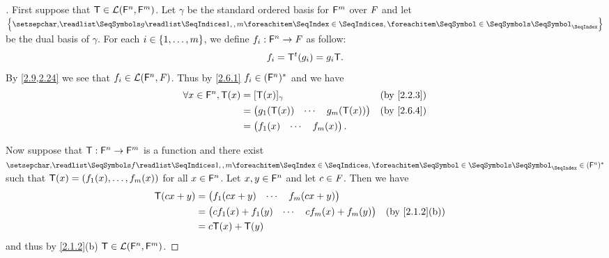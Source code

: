 \begin{proof}[]
  First suppose that \(\mathsf{T} \in \mathcal{L}(\mathsf{F}^n, \mathsf{F}^m)\).
  Let \(\gamma\) be the standard ordered basis for \(\mathsf{F}^m\) over \(\mathit{F}\) and let \(\set{\seq{g}{1,,m}}\) be the dual basis of \(\gamma\).
  For each \(i \in \left\lbrace1, \dots, m\right\rbrace\), we define \(f_i : \mathsf{F}^n \to \mathit{F}\) as follow:
  \[
    f_i = {\mathsf{T}}^{t}(g_i) = g_i \mathsf{T}.
  \]
  By \cref{2.9,2.24} we see that \(f_i \in \mathcal{L}(\mathsf{F}^n, \mathit{F})\).
  Thus by \cref{2.6.1} \(f_i \in (\mathsf{F}^n)^*\) and we have
  \begin{align*}
    \forall x \in \vs{F}^n, \T(x) & = [\T(x)]_{\gamma}                &  & \text{(by \cref{2.2.3})} \\
                                  & = \begin{pmatrix}
                                        g_1(\T(x)) & \cdots & g_m(\T(x))
                                      \end{pmatrix} &  & \text{(by \cref{2.6.4})}                   \\
                                  & = \begin{pmatrix}
                                        f_1(x) & \cdots & f_m(x)
                                      \end{pmatrix}.
  \end{align*}

  Now suppose that \(\mathsf{T} : \mathsf{F}^n \to \mathsf{F}^m\) is a function and there exist \(\seq{f}{1,,m} \in (\vs{F}^n)^*\) such that \(\mathsf{T}(x) = (f_1(x), \dots, f_m(x))\) for all \(x \in \mathsf{F}^n\).
  Let \(x, y \in \mathsf{F}^n\) and let \(c \in \mathit{F}\).
  Then we have
  \begin{align*}
    \T(cx + y) & = \begin{pmatrix}
                     f_1(cx + y) & \cdots & f_m(cx + y)
                   \end{pmatrix}             \\
               & = \begin{pmatrix}
                     c f_1(x) + f_1(y) & \cdots & c f_m(x) + f_m(y)
                   \end{pmatrix} &  & \text{(by \cref{2.1.2}(b))} \\
               & = c \T(x) + \T(y)
  \end{align*}
  and thus by \cref{2.1.2}(b) \(\mathsf{T} \in \mathcal{L}(\mathsf{F}^n, \mathsf{F}^m)\).
\end{proof}


